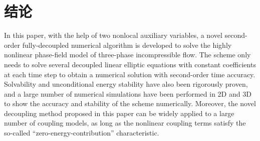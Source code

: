 \section{结论}
\label{sec:conclusion}
In this paper, with the help of two nonlocal auxiliary variables, a novel second-order fully-decoupled numerical algorithm is developed to solve the highly nonlinear phase-field model of three-phase incompressible flow. The scheme only needs to solve several decoupled linear elliptic equations with constant coefficients at each time step to obtain a numerical solution with second-order time accuracy. Solvability and unconditional energy stability have also been rigorously proven, and a large number of numerical simulations have been performed in 2D and 3D to show the accuracy and stability of the scheme numerically. Moreover, the novel decoupling method proposed in this paper can be widely applied to a large number of coupling models, as long as the nonlinear coupling terms satisfy the so-called “zero-energy-contribution” characteristic.










